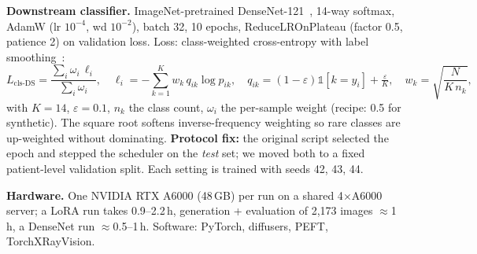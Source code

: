 \documentclass[twoside,english]{article}
\begin{document}
\textbf{Downstream classifier.} ImageNet-pretrained DenseNet-121~\citep{huang2017densenet}, 14-way softmax, AdamW (lr $10^{-4}$, wd $10^{-2}$), batch 32, 10 epochs, ReduceLROnPlateau (factor 0.5, patience 2) on validation loss. Loss: class-weighted cross-entropy with label smoothing~\citep{szegedy2016labelsmoothing}:
\begin{equation}
L_{\text{cls-DS}}=\frac{\sum_i \omega_i\,\ell_i}{\sum_i\omega_i},\quad
\ell_i=-\sum_{k=1}^{K}w_k\,q_{ik}\log p_{ik},\quad
q_{ik}=(1-\varepsilon)\mathbb 1[k=y_i]+\tfrac{\varepsilon}{K},\quad
w_k=\sqrt{\frac{N}{K\,n_k}},\label{eq:wce}
\end{equation}
with $K=14$, $\varepsilon=0.1$, $n_k$ the class count, $\omega_i$ the per-sample weight (recipe: 0.5 for synthetic). The square root softens inverse-frequency weighting so rare classes are up-weighted without dominating. \textbf{Protocol fix:} the original script selected the epoch and stepped the scheduler on the \emph{test} set; we moved both to a fixed patient-level validation split. Each setting is trained with seeds 42, 43, 44.

\textbf{Hardware.} One NVIDIA RTX A6000 (48\,GB) per run on a shared 4$\times$A6000 server; a LoRA run takes 0.9--2.2\,h, generation + evaluation of 2{,}173 images $\approx$1\,h, a DenseNet run $\approx$0.5--1\,h. Software: PyTorch, diffusers, PEFT, TorchXRayVision.
\end{document}
